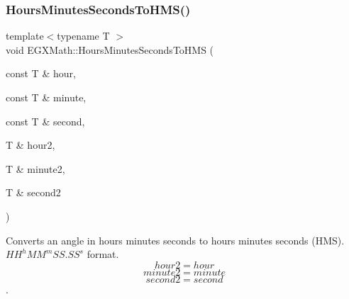 \mbox{\label{group___e_g_x_math-_angle_conversions-_hours_minutes_seconds_ga5ac65e4e7ed8857151b3f81f5928df3a}} 
\subsubsection{\texorpdfstring{Hours\+Minutes\+Seconds\+To\+H\+M\+S()}{HoursMinutesSecondsToHMS()}}
{\footnotesize\ttfamily template$<$typename T $>$ \\
void E\+G\+X\+Math\+::\+Hours\+Minutes\+Seconds\+To\+H\+MS (\begin{DoxyParamCaption}\item[{const T \&}]{hour,  }\item[{const T \&}]{minute,  }\item[{const T \&}]{second,  }\item[{T \&}]{hour2,  }\item[{T \&}]{minute2,  }\item[{T \&}]{second2 }\end{DoxyParamCaption})}



Converts an angle in hours minutes seconds to hours minutes seconds (H\+MS). ${HH}^h{MM}^m{SS.SS}^s$ format. \[hour2 = hour \] \[minute2 = minute\] \[second2 = second\]. 

